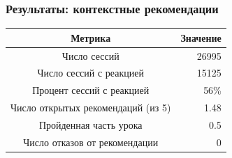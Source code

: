 \documentclass{beamer}
\begin{document}
\begin{frame}\frametitle{Результаты: контекстные рекомендации}

\bigskip

\begin{table}[H]
    \begin{tabular}{| c || r| }
      Метрика & Значение \\
      \hline		
      Число сессий & 26995 \\
      Число сессий с реакцией & 15125 \\
      Процент сессий с реакцией &  56\% \\
      Число открытых рекомендаций (из 5) & 1.48 \\
      Пройденная часть урока & 0.5 \\
      Число отказов от рекомендации & 0 \\
      \hline  
    \end{tabular}
\end{table}

\begin{figure}[H]
  \centering
  \hfill
\end{figure}

\end{frame}
\end{document}
